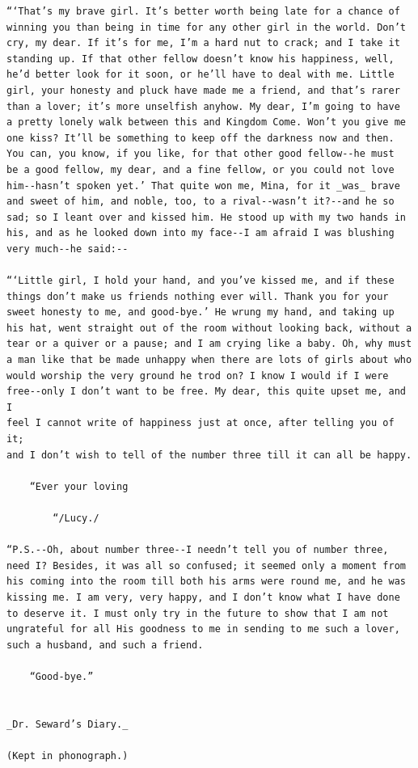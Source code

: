 \documentclass{article}
\begin{document}
\begin{verbatim}
“‘That’s my brave girl. It’s better worth being late for a chance of
winning you than being in time for any other girl in the world. Don’t
cry, my dear. If it’s for me, I’m a hard nut to crack; and I take it
standing up. If that other fellow doesn’t know his happiness, well,
he’d better look for it soon, or he’ll have to deal with me. Little
girl, your honesty and pluck have made me a friend, and that’s rarer
than a lover; it’s more unselfish anyhow. My dear, I’m going to have
a pretty lonely walk between this and Kingdom Come. Won’t you give me
one kiss? It’ll be something to keep off the darkness now and then.
You can, you know, if you like, for that other good fellow--he must
be a good fellow, my dear, and a fine fellow, or you could not love
him--hasn’t spoken yet.’ That quite won me, Mina, for it _was_ brave
and sweet of him, and noble, too, to a rival--wasn’t it?--and he so
sad; so I leant over and kissed him. He stood up with my two hands in
his, and as he looked down into my face--I am afraid I was blushing
very much--he said:--

“‘Little girl, I hold your hand, and you’ve kissed me, and if these
things don’t make us friends nothing ever will. Thank you for your
sweet honesty to me, and good-bye.’ He wrung my hand, and taking up
his hat, went straight out of the room without looking back, without a
tear or a quiver or a pause; and I am crying like a baby. Oh, why must
a man like that be made unhappy when there are lots of girls about who
would worship the very ground he trod on? I know I would if I were
free--only I don’t want to be free. My dear, this quite upset me, and I
feel I cannot write of happiness just at once, after telling you of it;
and I don’t wish to tell of the number three till it can all be happy.

    “Ever your loving

        “/Lucy./

“P.S.--Oh, about number three--I needn’t tell you of number three,
need I? Besides, it was all so confused; it seemed only a moment from
his coming into the room till both his arms were round me, and he was
kissing me. I am very, very happy, and I don’t know what I have done
to deserve it. I must only try in the future to show that I am not
ungrateful for all His goodness to me in sending to me such a lover,
such a husband, and such a friend.

    “Good-bye.”


_Dr. Seward’s Diary._

(Kept in phonograph.)


\end{verbatim}
\end{document}
